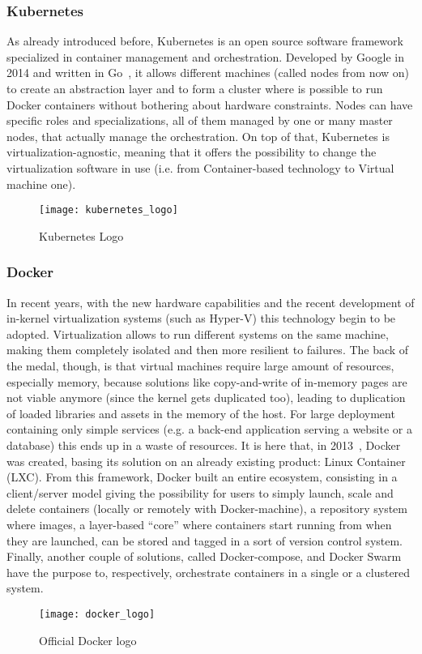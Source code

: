 \subsubsection{Kubernetes}

As already introduced before, Kubernetes is an open source software framework
specialized in container management and orchestration. Developed by Google in
2014 and written in Go~\cite{k8sGit}, it allows different machines (called nodes
from now on) to create an abstraction layer and to form a cluster where is
possible to run Docker containers without bothering about hardware constraints.
Nodes can have specific roles and specializations, all of them managed by one or
many master nodes, that actually manage the orchestration. On top of that,
Kubernetes is virtualization-agnostic, meaning that it offers the possibility to
change the virtualization software in use (i.e. from Container-based technology
to Virtual machine one).
\begin{figure}[h]
 \centering \texttt{[image: kubernetes\_logo]}
 \caption{Kubernetes Logo}
 \label{chap:intro:img:k8s_logo}
\end{figure}


\subsubsection{Docker}

In recent years, with the new hardware capabilities and the recent development
of in-kernel virtualization systems (such as Hyper-V) this technology begin to
be adopted. Virtualization allows to run different systems on the same machine,
making them completely isolated and then more resilient to failures. The back of
the medal, though, is that virtual machines require large amount of resources,
especially memory, because solutions like copy-and-write of in-memory pages are
not viable anymore (since the kernel gets duplicated too), leading to
duplication of loaded libraries and assets in the memory of the host. For large
deployment containing only simple services (e.g. a back-end application serving
a website or a database) this ends up in a waste of resources. It is here that,
in 2013~\cite{dockerWebsite}, Docker was created, basing its solution on an
already existing product: Linux Container (LXC). From this framework, Docker
built an entire ecosystem, consisting in a client/server model giving the
possibility for users to simply launch, scale and delete containers (locally or
remotely with Docker-machine), a repository system where images, a layer-based
``core'' where containers start running from when they are launched, can be
stored and tagged in a sort of version control system. Finally, another couple
of solutions, called Docker-compose, and Docker Swarm have the purpose to,
respectively, orchestrate containers in a single or a clustered system.
\begin{figure}[h]
 \centering \texttt{[image: docker\_logo]}
 \caption{Official Docker logo}
 \label{chap:intro:img:docker_logo}
\end{figure}

